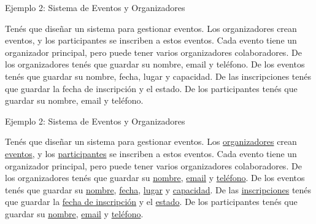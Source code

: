 \documentclass{beamer}
\begin{document}
\begin{frame}{Ejemplo 2: Sistema de Eventos y Organizadores}
    \begin{center}
        \small
        Tenés que diseñar un sistema para gestionar eventos. Los organizadores crean eventos, y los participantes se inscriben a estos eventos. Cada evento tiene un organizador principal, pero puede tener varios organizadores colaboradores. De los organizadores tenés que guardar su nombre, email y teléfono. De los eventos tenés que guardar su nombre, fecha, lugar y capacidad. De las inscripciones tenés que guardar la fecha de inscripción y el estado. De los participantes tenés que guardar su nombre, email y teléfono.
    \end{center}
\end{frame}

\begin{frame}{Ejemplo 2: Sistema de Eventos y Organizadores}
    \begin{center}
        \small
        Tenés que diseñar un sistema para gestionar eventos. Los \ul{organizadores} crean \ul{eventos}, y los \ul{participantes} se inscriben a estos eventos. Cada evento tiene un organizador principal, pero puede tener varios organizadores colaboradores. De los organizadores tenés que guardar su \ul{nombre}, \ul{email} y \ul{teléfono}. De los eventos tenés que guardar su \ul{nombre}, \ul{fecha}, \ul{lugar} y \ul{capacidad}. De las \ul{inscripciones} tenés que guardar la \ul{fecha de inscripción} y el \ul{estado}. De los participantes tenés que guardar su \ul{nombre}, \ul{email} y \ul{teléfono}.
    \end{center}
\end{frame}
\end{document}
